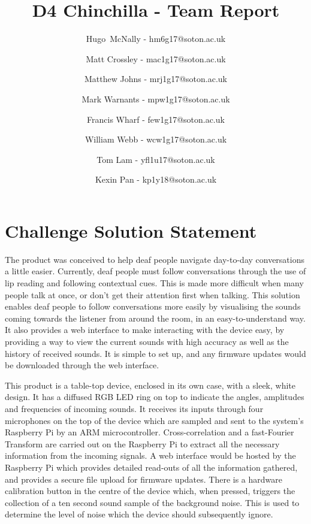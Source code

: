 \documentclass[a4paper]{article}
\begin{document}
\title{D4 Chinchilla - Team Report}
\author{
Hugo~McNally - hm6g17@soton.ac.uk
\and
Matt Crossley - mac1g17@soton.ac.uk
\and
Matthew Johns - mrj1g17@soton.ac.uk
\and
Mark Warnants - mpw1g17@soton.ac.uk
\and
Francis Wharf - few1g17@soton.ac.uk
\and
William Webb - wcw1g17@soton.ac.uk
\and
Tom Lam - yfl1u17@soton.ac.uk
\and
Kexin Pan - kp1y18@soton.ac.uk
}
\maketitle


\section{Challenge Solution Statement}
The product was conceived to help deaf people navigate day-to-day conversations
a little easier. Currently, deaf people must follow conversations through the
use of lip reading and following contextual cues. This is made more difficult
when many people talk at once, or don’t get their attention first when talking.
This solution enables deaf people to follow conversations more easily by
visualising the sounds coming towards the listener from around the room, in an
easy-to-understand way. It also provides a web interface to make interacting
with the device easy, by providing a way to view the current sounds with high
accuracy as well as the history of received sounds. It is simple to set up, and
any firmware updates would be downloaded through the web interface.

This product is a table-top device, enclosed in its own case, with a sleek,
white design. It has a diffused RGB LED ring on top to indicate the angles, amplitudes and frequencies of incoming sounds. It receives its inputs through four microphones on the top of the device which are sampled and sent to
the system's Raspberry Pi by an ARM microcontroller. Cross-correlation and a
fast-Fourier Transform are carried out on the Raspberry Pi to extract all the
necessary information from the incoming signals. A web interface would be
hosted by the Raspberry Pi which provides detailed read-outs of all the
information gathered, and provides a secure file upload for firmware updates.
There is a hardware calibration button in the centre of the device which,
when pressed, triggers the collection of a ten second sound sample of the
background noise. This is used to determine the level of noise which the device
should subsequently ignore.
\end{document}
